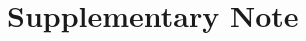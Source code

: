 \graphicspath{{./content/part_I/diff_in_graphs/figures/}}

\setcounter{equation}{0}
\setcounter{figure}{0}
\setcounter{table}{0}
\makeatletter %
\renewcommand{\thetable}{S\arabic{table}}
\renewcommand{\theequation}{S\arabic{equation}}
\renewcommand{\thefigure}{S\arabic{figure}}
\makeatother %

\section{Supplementary Note}
    \label{secSI:supmat}

